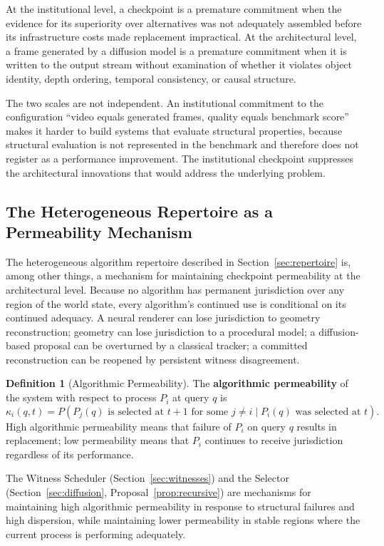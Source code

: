 \documentclass[11pt,a4paper]{article}
\theoremstyle{plain}
\theoremstyle{definition}
\newtheorem{definition}[theorem]{Definition}
\theoremstyle{remark}
\begin{document}
At the institutional level, a checkpoint is a premature commitment when the evidence for its superiority over alternatives was not adequately assembled before its infrastructure costs made replacement impractical. At the architectural level, a frame generated by a diffusion model is a premature commitment when it is written to the output stream without examination of whether it violates object identity, depth ordering, temporal consistency, or causal structure.

The two scales are not independent. An institutional commitment to the configuration ``video equals generated frames, quality equals benchmark score'' makes it harder to build systems that evaluate structural properties, because structural evaluation is not represented in the benchmark and therefore does not register as a performance improvement. The institutional checkpoint suppresses the architectural innovations that would address the underlying problem.

\subsection{The Heterogeneous Repertoire as a Permeability Mechanism}

The heterogeneous algorithm repertoire described in Section~\ref{sec:repertoire} is, among other things, a mechanism for maintaining checkpoint permeability at the architectural level. Because no algorithm has permanent jurisdiction over any region of the world state, every algorithm's continued use is conditional on its continued adequacy. A neural renderer can lose jurisdiction to geometry reconstruction; geometry can lose jurisdiction to a procedural model; a diffusion-based proposal can be overturned by a classical tracker; a committed reconstruction can be reopened by persistent witness disagreement.

\begin{definition}[Algorithmic Permeability]
The \textbf{algorithmic permeability} of the system with respect to process $P_i$ at query $q$ is
\[
\kappa_i(q, t) = P(P_j(q) \text{ is selected at } t+1 \text{ for some } j \neq i \mid P_i(q) \text{ was selected at } t).
\]
High algorithmic permeability means that failure of $P_i$ on query $q$ results in replacement; low permeability means that $P_i$ continues to receive jurisdiction regardless of its performance.
\end{definition}

The Witness Scheduler (Section~\ref{sec:witnesses}) and the Selector (Section~\ref{sec:diffusion}, Proposal~\ref{prop:recursive}) are mechanisms for maintaining high algorithmic permeability in response to structural failures and high dispersion, while maintaining lower permeability in stable regions where the current process is performing adequately.
\end{document}
